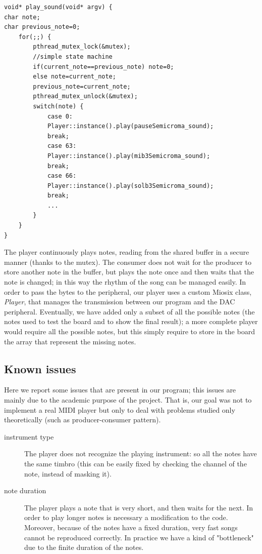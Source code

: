 \documentclass[12pt]{article}
\begin{document}
\begin{lstlisting}
void* play_sound(void* argv) {
char note;
char previous_note=0;
	for(;;) {
		pthread_mutex_lock(&mutex);
		//simple state machine
		if(current_note==previous_note) note=0;
		else note=current_note;
		previous_note=current_note;
		pthread_mutex_unlock(&mutex);
		switch(note) {
			case 0:
			Player::instance().play(pauseSemicroma_sound);
			break;
			case 63:
			Player::instance().play(mib3Semicroma_sound);
			break;
			case 66:
			Player::instance().play(solb3Semicroma_sound);
			break;
			...
		}
	}
}
\end{lstlisting}
The player continuously plays notes, reading from the shared buffer in a secure manner (thanks to the mutex). The consumer does not wait for the producer to store another note in the buffer, but plays the note once and then waits that the note is changed; in this way the rhythm of the song can be managed easily. \newline
In order to pass the bytes to the peripheral, our player uses a custom Miosix class, \textit{Player}, that manages the transmission between our program and the DAC peripheral. Eventually, we have added only a subset of all the possible notes (the notes used to test the board and to show the final result); a more complete player would require all the possible notes, but this simply require to store in the board the array that represent the missing notes.

\subsection{Known issues}
Here we report some issues that are present in our program; this issues are mainly due to the academic purpose of the project. That is, our goal was not to implement a real MIDI player but only to deal with problems studied only theoretically (such as producer-consumer pattern).
\begin{description}
	\item[instrument type] The player does not recognize the playing instrument: so all the notes have the same timbro (this can be easily fixed by checking the channel of the note, instead of masking it).
	\item[note duration] The player plays a note that is very short, and then waits for the next. In order to play longer notes is necessary a modification to the code. Moreover, because of the notes have a fixed duration, very fast songs cannot be reproduced correctly. In practice we have a kind of "bottleneck" due to the finite duration of the notes.
\end{description}
\end{document}

